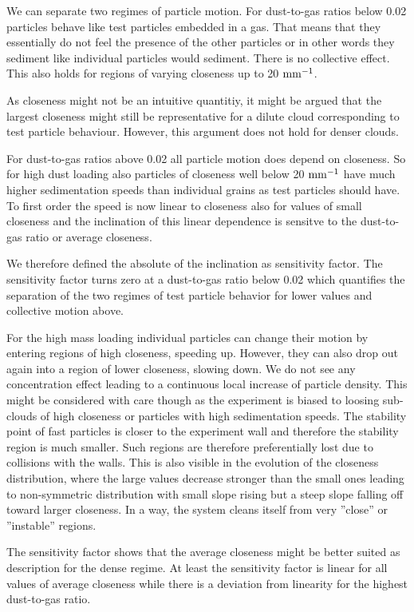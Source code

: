 We can separate two regimes of particle motion.
For dust-to-gas ratios below 0.02 particles behave like test particles embedded in a
gas. That means that they essentially do not feel the presence of the other particles or in other words they sediment like individual particles would sediment. There is no collective effect. This also holds for regions of varying closeness up to 20 $\rm mm^{-1}$. 

As closeness might not be an intuitive quantitiy, it might be argued that the largest closeness might still be representative for a dilute cloud corresponding to test particle behaviour. However, this argument does not hold for denser clouds.

For dust-to-gas ratios above 0.02 all particle motion does depend on closeness. So for
high dust loading also particles of closeness well below 20 $\rm mm^{-1}$ have much higher sedimentation speeds than individual grains as test particles should have. 
To first order the speed is now linear to closeness also for values of small closeness and the inclination of this linear dependence is sensitve to the dust-to-gas ratio or average closeness. 

We therefore defined the absolute of the inclination as sensitivity factor.
The sensitivity factor turns zero at a dust-to-gas ratio below 0.02 which quantifies the
separation of the two regimes of test particle behavior for lower values and collective
motion above.

For the high mass loading individual particles can change their motion by entering regions of high closeness, speeding up. However, they can also drop out again into
a region of lower closeness, slowing down. We do not see any concentration effect leading to a continuous local increase of particle density. This might be considered with care though as the experiment is biased to loosing sub-clouds of high closeness or particles with high sedimentation speeds. The stability point of fast particles is closer to the experiment wall and therefore the stability region is much smaller. Such regions are therefore preferentially lost due
to collisions with the walls. This is also visible in the evolution of the closeness distribution, where the large values decrease stronger than the small ones leading to
non-symmetric distribution with small slope rising but a steep slope falling off toward
larger closeness. In a way, the system cleans itself from 
very ''close'' or ''instable'' regions. 

The sensitivity factor shows that the average closeness might be better suited as description for the dense regime. At least 
the sensitivity factor is linear for all values of average closeness while there is a deviation from linearity for the highest dust-to-gas ratio. 

